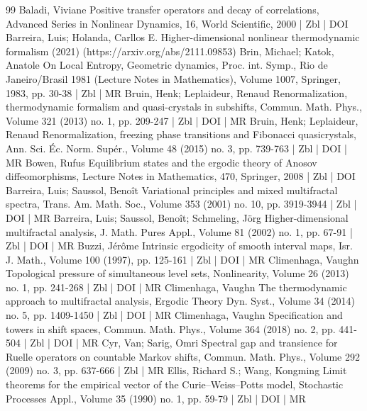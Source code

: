\documentclass[10pt]{amsart}
\theoremstyle{definition}\newtheorem{defi}[theo]{Definition}\newtheorem{rema}[theo]{Remark}\newtheorem{exam}[theo]{Example}\newtheorem{exem}[theo]{Example}\newtheorem{nota}[theo]{Notation}
\theoremstyle{plain}
\theoremstyle{plain}
\newcounter{In}
\newcommand*\8{\infty}
\begin{document}
\begin{thebibliography}{99}
Baladi, Viviane Positive transfer operators and decay of correlations, Advanced Series in Nonlinear Dynamics, 16, World Scientific, 2000 | Zbl | DOI
Barreira, Luis; Holanda, Carllos E. Higher-dimensional nonlinear thermodynamic formalism (2021) (https://arxiv.org/abs/2111.09853)
Brin, Michael; Katok, Anatole On Local Entropy, Geometric dynamics, Proc. int. Symp., Rio de Janeiro/Brasil 1981 (Lecture Notes in Mathematics), Volume 1007, Springer, 1983, pp. 30-38 | Zbl | MR
Bruin, Henk; Leplaideur, Renaud Renormalization, thermodynamic formalism and quasi-crystals in subshifts, Commun. Math. Phys., Volume 321 (2013) no. 1, pp. 209-247 | Zbl | DOI | MR
Bruin, Henk; Leplaideur, Renaud Renormalization, freezing phase transitions and Fibonacci quasicrystals, Ann. Sci. Éc. Norm. Supér., Volume 48 (2015) no. 3, pp. 739-763 | Zbl | DOI | MR
Bowen, Rufus Equilibrium states and the ergodic theory of Anosov diffeomorphisms, Lecture Notes in Mathematics, 470, Springer, 2008 | Zbl | DOI
Barreira, Luis; Saussol, Benoît Variational principles and mixed multifractal spectra, Trans. Am. Math. Soc., Volume 353 (2001) no. 10, pp. 3919-3944 | Zbl | DOI | MR
Barreira, Luis; Saussol, Benoît; Schmeling, Jörg Higher-dimensional multifractal analysis, J. Math. Pures Appl., Volume 81 (2002) no. 1, pp. 67-91 | Zbl | DOI | MR
Buzzi, Jérôme Intrinsic ergodicity of smooth interval maps, Isr. J. Math., Volume 100 (1997), pp. 125-161 | Zbl | DOI | MR
Climenhaga, Vaughn Topological pressure of simultaneous level sets, Nonlinearity, Volume 26 (2013) no. 1, pp. 241-268 | Zbl | DOI | MR
Climenhaga, Vaughn The thermodynamic approach to multifractal analysis, Ergodic Theory Dyn. Syst., Volume 34 (2014) no. 5, pp. 1409-1450 | Zbl | DOI | MR
Climenhaga, Vaughn Specification and towers in shift spaces, Commun. Math. Phys., Volume 364 (2018) no. 2, pp. 441-504 | Zbl | DOI | MR
Cyr, Van; Sarig, Omri Spectral gap and transience for Ruelle operators on countable Markov shifts, Commun. Math. Phys., Volume 292 (2009) no. 3, pp. 637-666 | Zbl | MR
Ellis, Richard S.; Wang, Kongming Limit theorems for the empirical vector of the Curie–Weiss–Potts model, Stochastic Processes Appl., Volume 35 (1990) no. 1, pp. 59-79 | Zbl | DOI | MR

\end{thebibliography}
\end{document}
